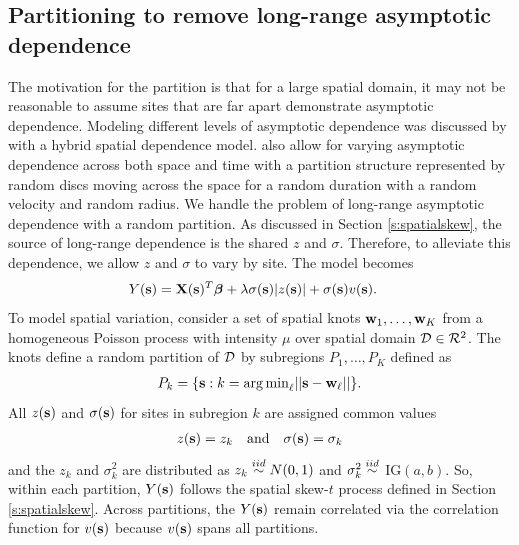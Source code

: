 \documentclass[11pt]{article}
\begin{document}
\subsection{Partitioning to remove long-range asymptotic dependence}\label{s:part}
The motivation for the partition is that for a large spatial domain, it may not be reasonable to assume sites that are far apart demonstrate asymptotic dependence.
Modeling different levels of asymptotic dependence was discussed by \citet{Wadsworth2012} with a hybrid spatial dependence model.
\citet{Huser2014} also allow for varying asymptotic dependence across both space and time with a partition structure represented by random discs moving across the space for a random duration with a random velocity and random radius.
We handle the problem of long-range asymptotic dependence with a random partition.
As discussed in Section \ref{s:spatialskew}, the source of long-range dependence is the shared $z$ and $\sigma$.
Therefore, to alleviate this dependence, we allow $z$ and $\sigma$ to vary by site.
The model becomes
\begin{align} \label{eq:partition}
  Y(\mbox{\bf s}) &= \mbox{\bf X}(\mbox{\bf s})^T \mbox{\boldmath $\beta$} + \lambda \sigma(\mbox{\bf s}) |z(\mbox{\bf s})| + \sigma(\mbox{\bf s}) v(\mbox{\bf s}).
\end{align}
To model spatial variation, consider a set of spatial knots $\mbox{\bf w}_1, \ldots, \mbox{\bf w}_K$ from a homogeneous Poisson process with intensity $\mu$ over spatial domain ${\cal D} \in {\cal R}^2$.
The knots define a random partition of ${\cal D}$ by subregions $P_{1}, \ldots, P_{K}$ defined as
\begin{align} \label{eq:subregions}
  P_{k} = \{ \mbox{\bf s} : k = {\mathop{\rm arg\, min}}_\ell || \mbox{\bf s} - \mbox{\bf w}_{\ell} || \}.
\end{align}
All $z(\mbox{\bf s})$ and $\sigma(\mbox{\bf s})$ for sites in subregion $k$ are assigned common values
\begin{align}
  z(\mbox{\bf s}) = z_{k} \quad \text{and} \quad \sigma(\mbox{\bf s}) = \sigma_{k} \label{eq:sitezsig}
\end{align}
and the $z_k$ and $\sigma^2_k$ are distributed as $z_k \stackrel{iid}{\sim} N(0, 1)$ and $\sigma^2_k \stackrel{iid}{\sim}$ IG$(a, b)$.
So, within each partition, $Y(\mbox{\bf s})$ follows the spatial skew-$t$ process defined in Section \ref{s:spatialskew}.
Across partitions, the $Y(\mbox{\bf s})$ remain correlated via the correlation function for $v(\mbox{\bf s})$ because $v(\mbox{\bf s})$ spans all partitions.
\end{document}
